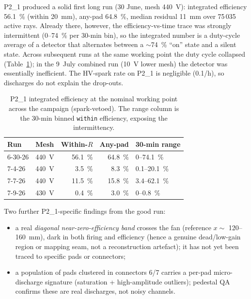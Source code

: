 \documentclass[11pt,a4paper]{article}
\newcommand{\detone}{P2\_1}
\newcommand{\code}[1]{\texttt{#1}}
\begin{document}
\detone{} produced a solid first long run (30 June, mesh \SI{440}{V}):
integrated efficiency \SI{56.1}{\percent} (within \SI{20}{mm}),
any-pad \SI{64.8}{\percent}, median residual \SI{11}{mm} over 75\,035 active
rays. Already there, however, the efficiency-vs-time trace was strongly
intermittent (0--\SI{74}{\percent} per 30-min bin), so the integrated number
is a duty-cycle average of a detector that alternates between a
$\sim$\SI{74}{\percent} ``on'' state and a silent state. Across subsequent
runs at the same working point the duty cycle collapsed
(Table~\ref{tab:det1runs}); in the 9~July combined run (\SI{10}{V} lower mesh)
the detector was essentially inefficient. The HV-spark rate on \detone{} is
negligible (0.1/h), so discharges do not explain the drop-outs.

\begin{table}[htb]
  \centering
  \caption{\detone{} integrated efficiency at the nominal working point across
  the campaign (spark-vetoed). The range column is the 30-min binned
  \code{within} efficiency, exposing the intermittency.}
  \label{tab:det1runs}
  \small
  \begin{tabular}{llrrl}
    \toprule
    Run & Mesh & Within-$R$ & Any-pad & 30-min range \\
    \midrule
    6-30-26 & \SI{440}{V} & \SI{56.1}{\percent} & \SI{64.8}{\percent} & 0--\SI{74.1}{\percent} \\
    7-4-26  & \SI{440}{V} & \SI{3.5}{\percent}  & \SI{8.3}{\percent}  & 0.1--\SI{20.1}{\percent} \\
    7-7-26  & \SI{440}{V} & \SI{11.5}{\percent} & \SI{15.8}{\percent} & 3.4--\SI{62.1}{\percent} \\
    7-9-26  & \SI{430}{V} & \SI{0.4}{\percent}  & \SI{3.0}{\percent}  & 0--\SI{0.8}{\percent} \\
    \bottomrule
  \end{tabular}
\end{table}

Two further \detone{}-specific findings from the good run:

\begin{itemize}[itemsep=2pt]
  \item a real \emph{diagonal near-zero-efficiency band} crosses the fan
        (reference $x \sim$ 120--\SI{160}{mm}), dark in both firing and
        efficiency (hence a genuine dead/low-gain region or mapping seam, not
        a reconstruction artefact); it has not yet been traced to specific
        pads or connectors;
  \item a population of pads clustered in connectors 6/7 carries a per-pad
        micro-discharge signature (saturation + high-amplitude outliers);
        pedestal QA confirms these are real discharges, not noisy channels.
\end{itemize}
\end{document}
